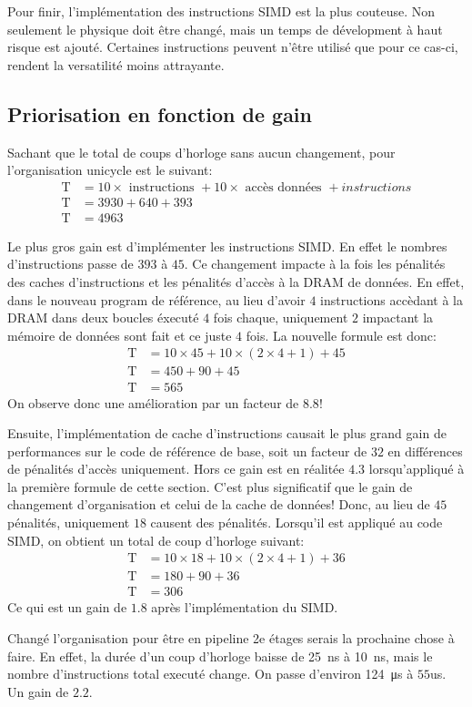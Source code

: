 \documentclass[a11paper]{article}
\newcommand{\todo}[1]{\begin{color}{Red}\textbf{TODO:} #1\end{color}}
\begin{document}
Pour finir, l'implémentation des instructions SIMD est la plus couteuse.
Non seulement le physique doit être changé, mais un temps de dévelopment à
haut risque est ajouté. Certaines instructions peuvent n'être utilisé que pour
ce cas-ci, rendent la versatilité moins attrayante.

\subsection{Priorisation en fonction de gain}
Sachant que le total de coups d'horloge sans aucun changement, pour
l'organisation unicycle est le suivant:
\begin{align}
  \text{T} &= 10\times\text{ instructions } + 10\times\text{ accès données } + instructions \\
  \text{T} &= 3930 + 640 + 393 \\
  \text{T} &= 4963
\end{align}

Le plus gros gain est d'implémenter les instructions SIMD. En effet le nombres
d'instructions passe de $393$ à $45$. Ce changement impacte à la fois les
pénalités des caches d'instructions et les pénalités d'accès à la DRAM de
données. En effet, dans le nouveau program de référence, au lieu d'avoir $4$
instructions accèdant à la DRAM dans deux boucles éxecuté $4$ fois chaque,
uniquement $2$ impactant la mémoire de données sont fait et ce juste $4$ fois.
La nouvelle formule est donc:
\begin{align}
  \text{T} &= 10\times45 + 10\times(2\times4+1) + 45 \\
  \text{T} &= 450 + 90 + 45 \\
  \text{T} &= 565
\end{align}
On observe donc une amélioration par un facteur de $8.8$!

Ensuite, l'implémentation de cache d'instructions causait le plus grand gain
de performances sur le code de référence de base, soit un facteur de $32$ en
différences de pénalités d'accès uniquement. Hors ce gain est en réalitée $4.3$
lorsqu'appliqué à la première formule de cette section. C'est plus significatif
que le gain de changement d'organisation et celui de la cache de données! Donc,
au lieu de $45$ pénalités, uniquement $18$ causent des pénalités.
Lorsqu'il est appliqué au code SIMD, on obtient un total de coup d'horloge
suivant:
\begin{align}
  \text{T} &= 10\times18 + 10\times(2\times4+1) + 36 \\
  \text{T} &= 180 + 90 + 36 \\
  \text{T} &= 306
\end{align}
Ce qui est un gain de $1.8$ après l'implémentation du SIMD.

Changé l'organisation pour être en pipeline 2e étages serais la prochaine chose
à faire. En effet, la durée d'un coup d'horloge baisse de \SI{25}{\nano\s} à \SI{10}{\nano\s}, mais
le nombre d'instructions total executé change. On passe d'environ \SI{124}{\micro\s} à
$55$us. Un gain de $2.2$.

\end{document}
